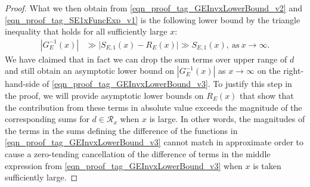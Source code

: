 \documentclass[11pt,reqno,a4letter]{article}
\numberwithin{figure}{section}
\numberwithin{table}{section}
\theoremstyle{plain}
\numberwithin{theorem}{section}
\theoremstyle{definition}
\begin{document}
\begin{proof}
What we then obtain from 
\eqref{eqn_proof_tag_GEInvxLowerBound_v2} and \eqref{eqn_proof_tag_SE1xFuncExp_v1} 
is the following lower bound by the triangle inequality 
that holds for all sufficiently large $x$: 
\begin{align} 
\label{eqn_proof_tag_GEInvxLowerBound_v3}
|G_E^{-1}(x)| & \gg 
     \Biggl\lvert S_{E,1}(x) - R_E(x) \Biggr\rvert \gg S_{E,1}(x), \mathrm{\ as\ } 
     x \rightarrow \infty. 
\end{align} 
We have claimed that in fact we can drop the sum terms over upper range of $d$ and still 
obtain an asymptotic lower bound on $|G_E^{-1}(x)|$ as $x \rightarrow \infty$ on the 
right-hand-side of \eqref{eqn_proof_tag_GEInvxLowerBound_v3}. 
To justify this step in the proof, 
we will provide asymptotic lower bounds on $R_E(x)$ that show that the 
contribution from these terms in absolute value exceeds the magnitude of the 
corresponding sums for $d \in \mathcal{R}_x$ when $x$ is large. 
In other words, the magnitudes of the terms in the sums 
defining the difference of the functions in \eqref{eqn_proof_tag_GEInvxLowerBound_v3} 
cannot match in approximate order to cause a zero-tending 
cancellation of the difference of terms in the middle expression from 
\eqref{eqn_proof_tag_GEInvxLowerBound_v3} when $x$ is taken sufficiently large. 


\end{proof}
\end{document}
